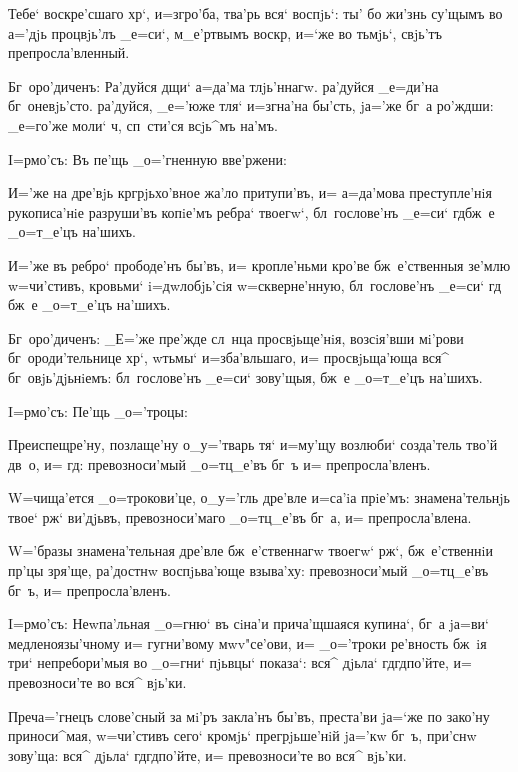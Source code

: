 Тебе` воскре'сшаго хр`, и=з\ъ гро'ба, тва'рь вся` 
воспjь`: ты' бо жи'знь су'щымъ во а='дjь процвjь'лъ 
_е=си`, м_е'ртвымъ воскр, и=`же во тьмjь`, свjь'тъ 
препросла'вленный.

Бг~оро'диченъ: Ра'дуйся дщи` а=да'ма тлjь'ннагw. 
ра'дуйся _е=ди'на бг~оневjь'сто. ра'дуйся, _е='юже тля` 
и=згна'на бы'сть, jа='же бг~а ро'ждши: _е=го'же моли` 
ч, сп~сти'ся всjь^мъ на'мъ.

 I=рмо'съ: Въ пе'щь _о='гненную вве'ржени:

И='же на дре'вjь кр грjьхо'вное жа'ло 
притупи'въ, и= а=да'мова преступле'нiя рукописа'нiе 
разруши'въ копiе'мъ ребра` твоегw`, бл~гослове'нъ _е=си` 
гд бж~е _о=т_е'цъ на'шихъ.

И='же въ ребро` прободе'нъ бы'въ, и= кропле'ньми 
кро'ве бж~е'ственныя зе'млю w=чи'стивъ, кровьми` 
i=дwлобjь'сiя w=скверне'нную, бл~гослове'нъ _е=си` гд 
бж~е _о=т_е'цъ на'шихъ.

Бг~оро'диченъ: _Е='же пре'жде сл~нца просвjьще'нiя, 
возсiя'вши мi'рови бг~ороди'тельнице хр`, w\т тьмы` 
и=зба'вльшаго, и= просвjьща'юща вся^ бг~овjь'дjьнiемъ: 
бл~гослове'нъ _е=си` зову'щыя, бж~е _о=т_е'цъ на'шихъ.

 I=рмо'съ: Пе'щь _о='троцы:

Преиспещре'ну, позлаще'ну о_у='тварь тя` и=му'щу 
возлюби` созда'тель тво'й дв~о, и= гд: превозноси'мый 
_о=тц_е'въ бг~ъ и= препросла'вленъ.

W=чища'ется _о=трокови'це, о_у='гль дре'вле и=са'iа 
прiе'мъ: знамена'тельнjь твое` рж` ви'дjьвъ, 
превозноси'маго _о=тц_е'въ бг~а, и= препросла'влена.

W='бразы знамена'тельная дре'вле бж~е'ственнагw 
твоегw` рж`, бж~е'ственнiи пр'цы зря'ще, 
ра'достнw воспjьва'юще взыва'ху: превозноси'мый 
_о=тц_е'въ бг~ъ, и= препросла'вленъ.


I=рмо'съ: Неwпа'льная _о=гню` въ сiна'и прича'щшаяся 
купина`, бг~а jа=ви` медленоязы'чному и= гугни'вому 
мwv"се'ови, и= _о='троки ре'вность бж~iя три` 
непребори'мыя во _о=гни` пjьвцы` показа`: вся^ дjьла` 
гд гд по'йте, и= превозноси'те во вся^ вjь'ки.

Преч а='гнецъ слове'сный за мi'ръ закла'нъ бы'въ, 
преста'ви jа=`же по зако'ну приноси^мая, w=чи'стивъ сего` 
кромjь` прегрjьше'нiй jа='кw бг~ъ, при'снw зову'ща: вся^ 
дjьла` гд гд по'йте, и= превозноси'те во вся^ 
вjь'ки.

